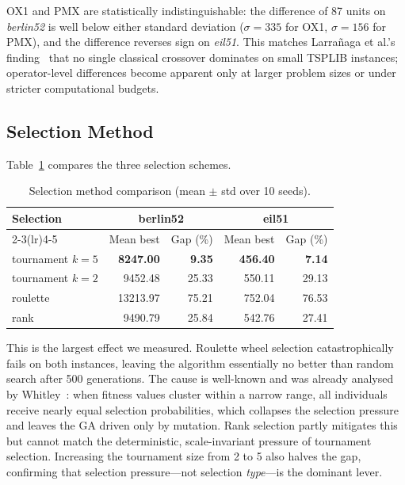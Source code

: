 \documentclass[conference]{IEEEtran}
\begin{document}
OX1 and PMX are statistically indistinguishable: the difference of 87
units on \textit{berlin52} is well below either standard deviation
($\sigma = 335$ for OX1, $\sigma = 156$ for PMX), and the difference
reverses sign on \textit{eil51}. This matches Larrañaga et al.'s
finding~\cite{larranaga1999} that no single classical crossover dominates
on small TSPLIB instances; operator-level differences become apparent only
at larger problem sizes or under stricter computational budgets.

\subsection{Selection Method}

Table~\ref{tab:selection} compares the three selection schemes.

\begin{table}[h]
\caption{Selection method comparison (mean $\pm$ std over 10 seeds).}
\label{tab:selection}
\centering
\begin{tabular}{lrrrr}
\toprule
\multicolumn{1}{l}{\textbf{Selection}} &
\multicolumn{2}{c}{\textbf{berlin52}} &
\multicolumn{2}{c}{\textbf{eil51}} \\
\cmidrule(lr){2-3}\cmidrule(lr){4-5}
& Mean best & Gap (\%) & Mean best & Gap (\%) \\
\midrule
tournament $k=5$ & \textbf{8247.00} & \textbf{9.35} & \textbf{456.40} & \textbf{7.14} \\
tournament $k=2$ & 9452.48 & 25.33 & 550.11 & 29.13 \\
roulette         & 13213.97 & 75.21 & 752.04 & 76.53 \\
rank             & 9490.79 & 25.84 & 542.76 & 27.41 \\
\bottomrule
\end{tabular}
\end{table}

This is the largest effect we measured. Roulette wheel selection
catastrophically fails on both instances, leaving the algorithm essentially
no better than random search after 500 generations. The cause is
well-known and was already analysed by Whitley~\cite{whitley1989}: when
fitness values cluster within a narrow range, all individuals receive
nearly equal selection probabilities, which collapses the selection
pressure and leaves the GA driven only by mutation. Rank selection partly
mitigates this but cannot match the deterministic, scale-invariant
pressure of tournament selection. Increasing the tournament size from 2 to
5 also halves the gap, confirming that selection pressure---not
selection \emph{type}---is the dominant lever.
\end{document}
